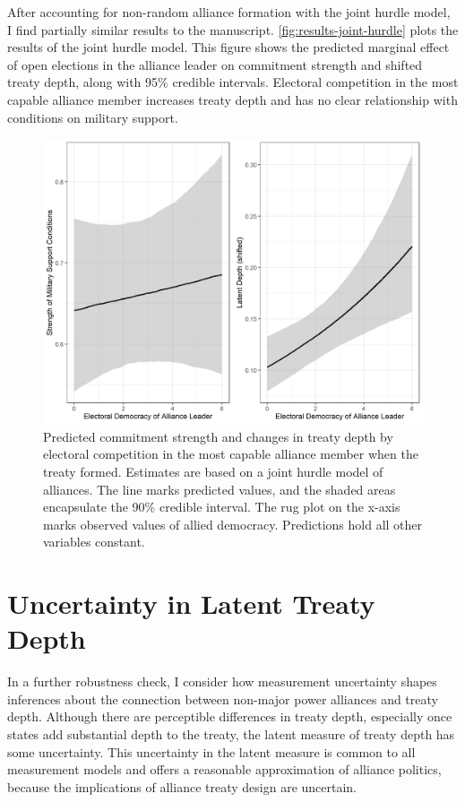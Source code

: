 \documentclass[12pt]{article}
\begin{document}
After accounting for non-random alliance formation with the joint hurdle model, I find partially similar results to the manuscript. 
\autoref{fig:results-joint-hurdle} plots the results of the joint hurdle model. 
This figure shows the predicted marginal effect of open elections in the alliance leader on commitment strength and shifted treaty depth, along with 95\% credible intervals.
Electoral competition in the most capable alliance member increases treaty depth and has no clear relationship with conditions on military support. 


\begin{figure}
\includegraphics[width=.95\textwidth]{results-joint-hurdle.png}  
\caption{Predicted commitment strength and changes in treaty depth by electoral competition in the most capable alliance member when the treaty formed. Estimates are based on a joint hurdle model of alliances. The line marks predicted values, and the shaded areas encapsulate the 90\% credible interval. The rug plot on the x-axis marks observed values of allied democracy. Predictions hold all other variables constant.}
\label{fig:results-joint-hurdle}
\end{figure}




\section{Uncertainty in Latent Treaty Depth} 


In a further robustness check, I consider how measurement uncertainty shapes inferences about the connection between non-major power alliances and treaty depth. 
Although there are perceptible differences in treaty depth, especially once states add substantial depth to the treaty, the latent measure of treaty depth has some uncertainty. 
This uncertainty in the latent measure is common to all measurement models and offers a reasonable approximation of alliance politics, because the implications of alliance treaty design are uncertain.  
\end{document}
